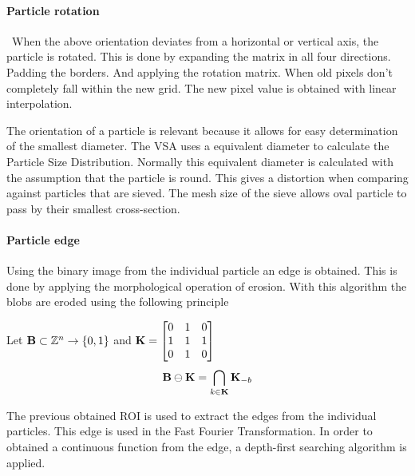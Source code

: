 \documentclass[11pt,fleqn,,a4paper,twoside,openright]{book}
\begin{document}
\paragraph{Particle rotation}\
When the above orientation deviates from a horizontal or vertical axis, the particle is rotated. This is done by expanding the matrix in all four directions. Padding the borders. And applying the rotation matrix. When old pixels don't completely fall within the new grid. The new pixel value is obtained with linear interpolation.

\begin{remark}
	The orientation of a particle is relevant because it allows for easy determination of the smallest diameter. The VSA uses a equivalent diameter to calculate the Particle Size Distribution. Normally this equivalent diameter is calculated with the assumption that the particle is round. This gives a distortion when comparing against particles that are sieved. The mesh size of the sieve allows oval particle to pass by their smallest cross-section.
\end{remark}

\paragraph{Particle edge}
Using the binary image from the individual particle an edge is obtained. This is done by applying the morphological operation of erosion. With this algorithm the blobs are eroded using the following principle
\begin{sBox}
	Let $\mat{B} \subset \mathbb{Z}^n \rightarrow \{0, 1\}$ and $ \mat{K} = \begin{bmatrix}
	0 & 1 & 0 \\
	1 & 1 & 1 \\
	0 & 1 & 0 \\
	\end{bmatrix} $
	\begin{equation}
	\mat{B}  \ominus \mat{K} = \bigcap_{k\in \mat{K}} \mat{K}_{-b}
	\end{equation}
\end{sBox}

The previous obtained ROI is used to extract the edges from the individual particles. This edge is used in the Fast Fourier Transformation. In order to obtained a continuous function from the edge, a depth-first searching algorithm is applied. 
\end{document}
